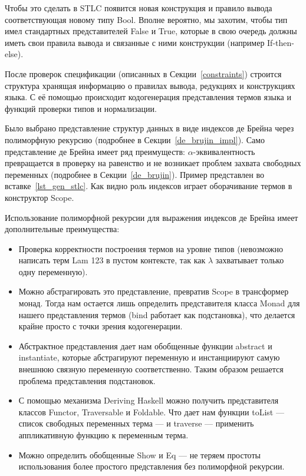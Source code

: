 Чтобы это сделать в STLC появится новая конструкция и правило вывода соответствующая новому типу Bool. Вполне вероятно, мы захотим, чтобы тип имел стандартных представителей False и True, которые в свою очередь должны иметь свои правила вывода и связанные с ними конструкции (например If-then-else).

\hfill

После проверок спецификации (описанных в Секции~\ref{constraints}) строится структура хранящая информацию о правилах вывода, редукциях и конструкциях языка. С её помощью происходит кодогенерация представления термов языка и функций проверки типов и нормализации.

Было выбрано представление структур данных в виде индексов де Брейна\cite{de_brujin} через полиморфную рекурсию (подробнее в Секции~\ref{de_brujin_impl}). Само представление де Брейна имеет ряд преимуществ: $\alpha$-эквивалентность превращается в проверку на равенство и не возникает проблем захвата свободных переменных (подробнее в Секции~\ref{de_brujin}). Пример представлен во вставке~\ref{lst_gen_stlc}. Как видно роль индексов играет оборачивание термов в конструктор Scope.

Использование полиморфной рекурсии для выражения индексов де Брейна имеет дополнительные преимущества:
\begin{itemize}
  \item Проверка корректности построения термов на уровне типов (невозможно написать терм Lam 123 в пустом контексте, так как $\lambda$ захватывает только одну переменную).
  \item Можно абстрагировать это представление, превратив Scope в трансформер монад. Тогда нам остается лишь определить представителя класса Monad для нашего представления термов (bind работает как подстановка), что делается крайне просто с точки зрения кодогенерации.
  \item Абстрактное представления дает нам обобщенные функции abstract и instantiate, которые абстрагируют переменную и инстанциируют самую внешнюю связную переменную соответственно. Таким образом решается проблема представления подстановок.
  \item С помощью механизма Deriving Haskell можно получить представителя классов Functor, Traversable и Foldable. Что дает нам функции toList --- список свободных переменных терма --- и traverse --- применить аппликативную функцию к переменным терма.
  \item Можно определить обобщенные Show и Eq --- не теряем простоты использования более простого представления без полиморфной рекурсии.
\end{itemize}

